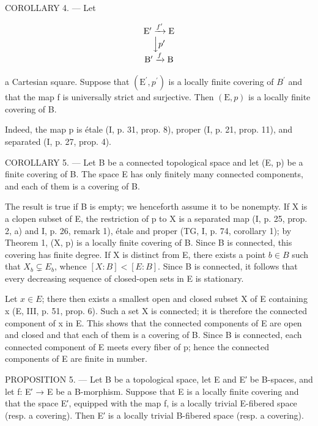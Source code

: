 COROLLARY 4. --- Let

\[
\begin{array}{c} \mathrm{E} ^ {\prime} \xrightarrow {f ^ {\prime}} \mathrm{E} \\ \Big \downarrow p ^ {\prime} \\ \mathrm{B} ^ {\prime} \xrightarrow {f} \mathrm{B} \end{array}
\]

a Cartesian square. Suppose that \((\mathrm{E}^{\prime}, p^{\prime})\) is a locally finite covering of \(B^{\prime}\) and that the map f is universally strict and surjective. Then \((\mathrm{E}, p)\) is a locally finite covering of B.

Indeed, the map p is étale (I, p. 31, prop. 8), proper (I, p. 21, prop. 11), and separated (I, p. 27, prop. 4).

COROLLARY 5. --- Let B be a connected topological space and let (E, p) be a finite covering of B. The space E has only finitely many connected components, and each of them is a covering of B.

The result is true if B is empty; we henceforth assume it to be nonempty. If X is a clopen subset of E, the restriction of p to X is a separated map (I, p. 25, prop. 2, a) and I, p. 26, remark 1), étale and proper (TG, I, p. 74, corollary 1); by Theorem 1, (X, p) is a locally finite covering of B. Since B is connected, this covering has finite degree. If X is distinct from E, there exists a point \(b \in B\) such that \(X_{b} \subsetneq E_{b}\), whence \([X:B] < [E:B]\). Since B is connected, it follows that every decreasing sequence of closed-open sets in E is stationary.

Let \(x \in E\); there then exists a smallest open and closed subset X of E containing x (E, III, p. 51, prop. 6). Such a set X is connected; it is therefore the connected component of x in E. This shows that the connected components of E are open and closed and that each of them is a covering of B. Since B is connected, each connected component of E meets every fiber of p; hence the connected components of E are finite in number.

PROPOSITION 5. — Let B be a topological space, let E and E′ be B-spaces, and let f: E′ → E be a B-morphism. Suppose that E is a locally finite covering and that the space E′, equipped with the map f, is a locally trivial E-fibered space (resp. a covering). Then E′ is a locally trivial B-fibered space (resp. a covering).

